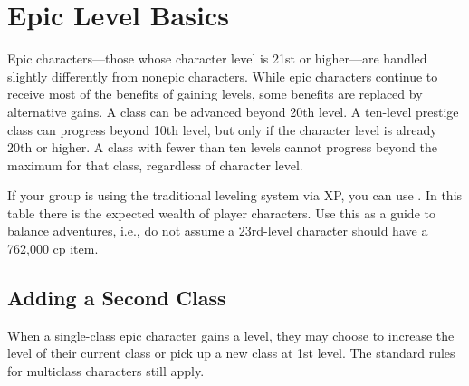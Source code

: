 \section{Epic Level Basics}
Epic characters---those whose character level is 21st or higher---are handled slightly differently from nonepic characters. While epic characters continue to receive most of the benefits of gaining levels, some benefits are replaced by alternative gains. A class can be advanced beyond 20th level. A ten-level prestige class can progress beyond 10th level, but only if the character level is already 20th or higher. A class with fewer than ten levels cannot progress beyond the maximum for that class, regardless of character level.

If your group is using the traditional leveling system via XP, you can use . In this table there is the expected wealth of player characters. Use this as a guide to balance adventures, i.e., do not assume a 23rd-level character should have a 762,000 cp item.






\subsection{Adding a Second Class}
When a single-class epic character gains a level, they may choose to increase the level of their current class or pick up a new class at 1st level. The standard rules for multiclass characters still apply.



